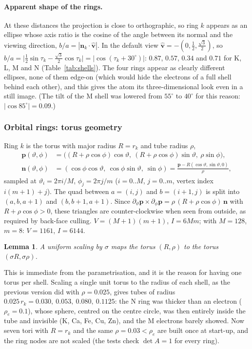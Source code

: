 \documentclass[a4paper, 11pt]{article}
\newtheorem{lemma}[proposition]{{\bf Lemma}}
\begin{document}
\paragraph{Apparent shape of the rings.} At these distances the projection is close to orthographic, so ring $k$ appears as an ellipse whose
axis ratio is the cosine of the angle between its normal and the viewing direction, $b/a=|\mathbf n_k\cdot\hat{\mathbf v}|$. In the default view
$\hat{\mathbf v}=-(0,\tfrac12,\tfrac{\sqrt3}{2})$, so $b/a=\bigl|\tfrac12\sin\tau_k-\tfrac{\sqrt3}{2}\cos\tau_k\bigr|=|\cos(\tau_k+30^\circ)|$:
$0.87$, $0.57$, $0.34$ and $0.71$ for K, L, M and N (Table~\ref{tab:shells}). The four rings appear as clearly different ellipses, none of
them edge-on (which would hide the electrons of a full shell behind each other), and this gives the atom its three-dimensional look even in a
still image. (The tilt of the M shell was lowered from $55^\circ$ to $40^\circ$ for this reason: $|\cos85^\circ|=0.09$.)

\subsubsection{Orbital rings: torus geometry}

Ring $k$ is the torus with major radius $R=r_k$ and tube radius $\rho$,
\begin{align*}
  \mathbf p(\vartheta,\phi)&=\bigl((R+\rho\cos\phi)\cos\vartheta,\ (R+\rho\cos\phi)\sin\vartheta,\ \rho\sin\phi\bigr),\\
  \mathbf n(\vartheta,\phi)&=(\cos\phi\cos\vartheta,\ \cos\phi\sin\vartheta,\ \sin\phi)=\frac{\mathbf p-R(\cos\vartheta,\sin\vartheta,0)}{\rho},
\end{align*}
sampled at $\vartheta_i=2\pi i/M$, $\phi_j=2\pi j/m$ ($i=0..M$, $j=0..m$, vertex index $i(m+1)+j$). The quad between $a=(i,j)$ and $b=(i{+}1,j)$
is split into $(a,b,a{+}1)$ and $(b,b{+}1,a{+}1)$. Since
$\partial_\vartheta\mathbf p\times\partial_\phi\mathbf p=\rho\,(R+\rho\cos\phi)\,\mathbf n$ with $R+\rho\cos\phi>0$, these triangles are
counter-clockwise when seen from outside, as required by back-face culling. $V=(M+1)(m+1)$, $I=6Mm$; with $M=128$, $m=8$: $V=1161$, $I=6144$.

\begin{lemma}
A uniform scaling by $\sigma$ maps the torus $(R,\rho)$ to the torus $(\sigma R,\sigma\rho)$.
\end{lemma}
\noindent This is immediate from the parametrisation, and it is the reason for having one torus per shell. Scaling a single unit torus to
the radius of each shell, as the previous version did with $\rho=0.025$, gives tubes of radius $0.025\,r_k=0.030,\ 0.053,\ 0.080,\ 0.1125$:
the N ring was thicker than an electron ($\rho_e=0.1$), whose sphere, centred on the centre circle, was then entirely inside the tube and
invisible (K, Ca, Fe, Cu, Zn), and the M electrons barely showed. Now seven tori with $R=r_k$ and the same $\rho=0.03<\rho_e$ are built once at
start-up, and the ring nodes are not scaled (the tests check $\det A=1$ for every ring).
\end{document}
